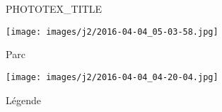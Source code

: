 \documentclass[11pt, a4paper, twoside, openright]{book}
\begin{document}
\pagestyle{empty}

\begin{titlepage}
  \begin{center}
    {\Huge PHOTOTEX_TITLE}
  \end{center}
\end{titlepage}
\clearpage%

\mainmatter%

\begin{minipage}[t][0.025\textheight][t]{\textwidth}
  \hfill\vfill
\end{minipage}
\begin{minipage}[t][0.45\textheight][t]{\textwidth}
  \begin{center}
    \texttt{[image: images/j2/2016-04-04\_05-03-58.jpg]}\\[1em]
  \end{center}
\end{minipage}
\begin{minipage}[t][0.03\textheight][t]{\textwidth}
  \begin{center}
    Parc\\[1em]
  \end{center}
\end{minipage}
\begin{minipage}[t][0.45\textheight][t]{\textwidth}
  \begin{center}
    \texttt{[image: images/j2/2016-04-04\_04-20-04.jpg]}\\[1em]
  \end{center}
\end{minipage}
\begin{minipage}[t][0.03\textheight][t]{\textwidth}
  \begin{center}
    Légende\\[1em]
  \end{center}
\end{minipage}

\end{document}
